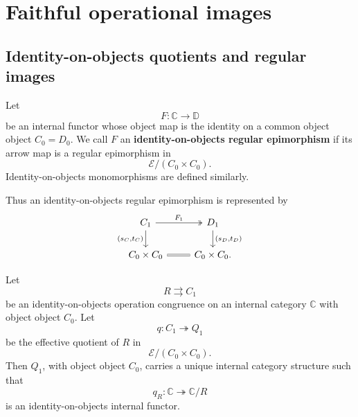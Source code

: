 \section{Faithful operational images}
\label{sec:to-faithful-operational-images}

\subsection{Identity-on-objects quotients and regular images}
\label{subsec:to-ioo-regular-images}

\begin{definition}
\label{def:to-ioo-regular-epi}
    Let
    \[
        F:\mathbb C\to\mathbb D
    \]
    be an internal functor whose object map is the identity on a common object
    object \(C_0=D_0\). We call \(F\) an
    \textbf{identity-on-objects regular epimorphism} if its arrow map is a
    regular epimorphism in
    \[
        \mathcal E/(C_0\times C_0).
    \]
    Identity-on-objects monomorphisms are defined similarly.
\end{definition}

Thus an identity-on-objects regular epimorphism is represented by
\[
\begin{tikzcd}
    C_1
        \arrow[r, two heads, "F_1"]
        \arrow[d, "{(s_C,t_C)}"']
    &
    D_1
        \arrow[d, "{(s_D,t_D)}"]
    \\
    C_0\times C_0
        \arrow[r, equal]
    &
    C_0\times C_0.
\end{tikzcd}
\]

\begin{lemma}
\label{lem:to-quotient-operation-congruence}
    Let
    \[
        R\rightrightarrows C_1
    \]
    be an identity-on-objects operation congruence on an internal category
    \(\mathbb C\) with object object \(C_0\). Let
    \[
        q:C_1\twoheadrightarrow Q_1
    \]
    be the effective quotient of \(R\) in
    \[
        \mathcal E/(C_0\times C_0).
    \]
    Then \(Q_1\), with object object \(C_0\), carries a unique internal
    category structure such that
    \[
        q_R:
        \mathbb C\twoheadrightarrow\mathbb C/R
    \]
    is an identity-on-objects internal functor.
\end{lemma}

